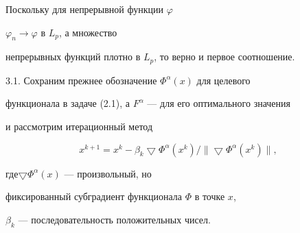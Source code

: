 Поскольку для непрерывной функции $\varphi$\;


$\varphi_n \to \varphi$ в $L_p$, а множество


непрерывных функций плотно в $L_p$, то верно и первое соотношение.


\medskip





3.1. Сохраним прежнее обозначение $\Phi^\alpha(x)$ для целевого


функционала в задаче (2.1), а $F^\alpha$ --- для его оптимального значения


и рассмотрим итерационный метод


\begin{equation}


x^{k+1} = x^k - \beta_k \bigtriangledown\Phi^\alpha(x^k)/


\|\bigtriangledown\Phi^\alpha(x^k)\|,


\end{equation}


где$ \bigtriangledown\Phi^\alpha(x)$ --- произвольный, но


фиксированный субградиент функционала $\Phi$ в точке $x$,


$\beta_k$ --- последовательность положительных чисел.





